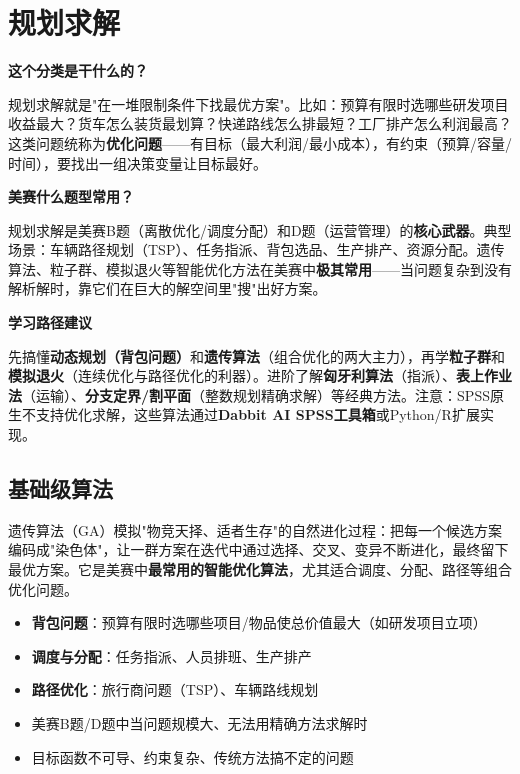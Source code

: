 \chapter{规划求解}

\begin{chapteroverview}
\textbf{这个分类是干什么的？}

规划求解就是"在一堆限制条件下找最优方案"。比如：预算有限时选哪些研发项目收益最大？货车怎么装货最划算？快递路线怎么排最短？工厂排产怎么利润最高？这类问题统称为\textbf{优化问题}——有目标（最大利润/最小成本），有约束（预算/容量/时间），要找出一组决策变量让目标最好。

\textbf{美赛什么题型常用？}

规划求解是美赛B题（离散优化/调度分配）和D题（运营管理）的\textbf{核心武器}。典型场景：车辆路径规划（TSP）、任务指派、背包选品、生产排产、资源分配。遗传算法、粒子群、模拟退火等智能优化方法在美赛中\textbf{极其常用}——当问题复杂到没有解析解时，靠它们在巨大的解空间里"搜"出好方案。

\textbf{学习路径建议}

先搞懂\textbf{动态规划（背包问题）}和\textbf{遗传算法}（组合优化的两大主力），再学\textbf{粒子群}和\textbf{模拟退火}（连续优化与路径优化的利器）。进阶了解\textbf{匈牙利算法}（指派）、\textbf{表上作业法}（运输）、\textbf{分支定界/割平面}（整数规划精确求解）等经典方法。注意：SPSS原生不支持优化求解，这些算法通过\textbf{Dabbit AI SPSS工具箱}或Python/R扩展实现。
\end{chapteroverview}

\section{基础级算法}


\begin{algointro}
遗传算法（GA）模拟"物竞天择、适者生存"的自然进化过程：把每一个候选方案编码成"染色体"，让一群方案在迭代中通过选择、交叉、变异不断进化，最终留下最优方案。它是美赛中\textbf{最常用的智能优化算法}，尤其适合调度、分配、路径等组合优化问题。
\end{algointro}

\begin{algoscene}
\begin{itemize}
    \item \textbf{背包问题}：预算有限时选哪些项目/物品使总价值最大（如研发项目立项）
    \item \textbf{调度与分配}：任务指派、人员排班、生产排产
    \item \textbf{路径优化}：旅行商问题（TSP）、车辆路线规划
    \item 美赛B题/D题中当问题规模大、无法用精确方法求解时
    \item 目标函数不可导、约束复杂、传统方法搞不定的问题
\end{itemize}
\end{algoscene}


